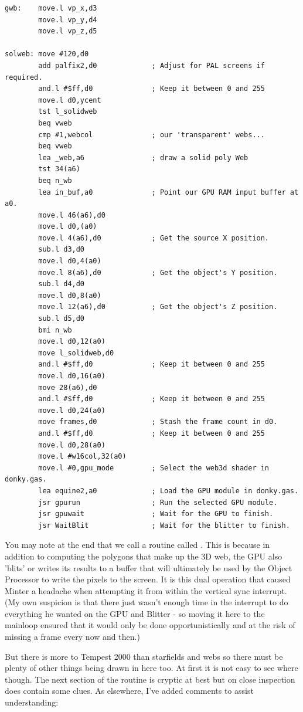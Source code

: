 \begin{lstlisting}[escapechar=\%]
gwb:    move.l vp_x,d3
        move.l vp_y,d4
        move.l vp_z,d5
    
solweb: move #120,d0
        add palfix2,d0             ; Adjust for PAL screens if required.
        and.l #$ff,d0              ; Keep it between 0 and 255
        move.l d0,ycent
        tst l_solidweb
        beq vweb
        cmp #1,webcol              ; our 'transparent' webs...
        beq vweb
        lea _web,a6                ; draw a solid poly Web
        tst 34(a6)
        beq n_wb
        lea in_buf,a0              ; Point our GPU RAM input buffer at a0.
        move.l 46(a6),d0
        move.l d0,(a0)
        move.l 4(a6),d0            ; Get the source X position.
        sub.l d3,d0
        move.l d0,4(a0)
        move.l 8(a6),d0            ; Get the object's Y position.
        sub.l d4,d0
        move.l d0,8(a0)
        move.l 12(a6),d0           ; Get the object's Z position.
        sub.l d5,d0
        bmi n_wb
        move.l d0,12(a0)
        move l_solidweb,d0
        and.l #$ff,d0              ; Keep it between 0 and 255
        move.l d0,16(a0)
        move 28(a6),d0
        and.l #$ff,d0              ; Keep it between 0 and 255
        move.l d0,24(a0)
        move frames,d0             ; Stash the frame count in d0.
        and.l #$ff,d0              ; Keep it between 0 and 255
        move.l d0,28(a0)
        move.l #w16col,32(a0)
        move.l #0,gpu_mode         ; Select the web3d shader in donky.gas.
        lea equine2,a0             ; Load the GPU module in donky.gas.
        jsr gpurun                 ; Run the selected GPU module.
        jsr gpuwait                ; Wait for the GPU to finish.
        jsr WaitBlit               ; Wait for the blitter to finish.
\end{lstlisting}
You may note at the end that we call a routine called . This is because in addition to computing the
polygons that make up the 3D web, the GPU also 'blits' or writes its results to a buffer that will ultimately be used
by the Object Processor to write the pixels to the screen. It is this dual operation that caused Minter a headache
when attempting it from within the vertical sync interrupt. (My own suspicion is that there just wasn't enough time in the
interrupt to do everything he wanted on the GPU and Blitter - so moving it here to the mainloop ensured that it would only
be done opportunistically and at the risk of missing a frame every now and then.)

But there is more to Tempest 2000 than starfields and webs so there must be plenty of other things being drawn in here too.
At first it is not easy to see where though. The next section of the  routine is cryptic at best 
but on close inspection does contain some clues. As elsewhere, I've added comments to assist understanding:

